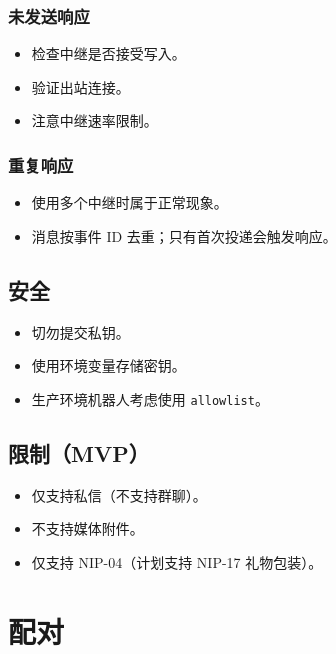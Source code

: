 \subsubsection{未发送响应}


\begin{itemize}
  \item 检查中继是否接受写入。
  \item 验证出站连接。
  \item 注意中继速率限制。
\end{itemize}


\subsubsection{重复响应}


\begin{itemize}
  \item 使用多个中继时属于正常现象。
  \item 消息按事件 ID 去重；只有首次投递会触发响应。
\end{itemize}


\subsection{安全}


\begin{itemize}
  \item 切勿提交私钥。
  \item 使用环境变量存储密钥。
  \item 生产环境机器人考虑使用 \texttt{allowlist}。
\end{itemize}


\subsection{限制（MVP）}


\begin{itemize}
  \item 仅支持私信（不支持群聊）。
  \item 不支持媒体附件。
  \item 仅支持 NIP-04（计划支持 NIP-17 礼物包装）。
\end{itemize}



\clearpage

\section{配对}


